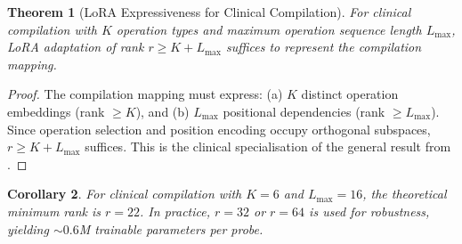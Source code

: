 \documentclass[11pt,twocolumn,a4paper]{article}
\newtheorem{theorem}{Theorem}[section]
\newtheorem{corollary}[theorem]{Corollary}
\theoremstyle{definition}
\theoremstyle{remark}
\begin{document}
\begin{theorem}[LoRA Expressiveness for Clinical Compilation]
\label{thm:lora_expressiveness}
For clinical compilation with $K$ operation types and maximum operation sequence length $L_{\max}$, LoRA adaptation of rank $r \geq K + L_{\max}$ suffices to represent the compilation mapping.
\end{theorem}

\begin{proof}
The compilation mapping must express: (a) $K$ distinct operation embeddings (rank $\geq K$), and (b) $L_{\max}$ positional dependencies (rank $\geq L_{\max}$). Since operation selection and position encoding occupy orthogonal subspaces, $r \geq K + L_{\max}$ suffices. This is the clinical specialisation of the general result from \citep{sachikonye2025b}.
\end{proof}

\begin{corollary}
For clinical compilation with $K = 6$ and $L_{\max} = 16$, the theoretical minimum rank is $r = 22$. In practice, $r = 32$ or $r = 64$ is used for robustness, yielding $\sim\!0.6$M trainable parameters per probe.
\end{corollary}
\end{document}
